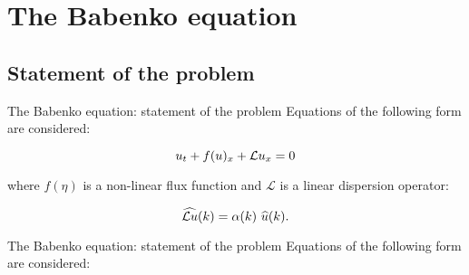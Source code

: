 
\section{The Babenko equation}
\subsection{Statement of the problem}
\begin{frame}{The Babenko equation: statement of the problem}
Equations of the following form are considered: 

\begin{equation}
u_t+ f(u)_x + \mathcal{L} u_x=0 
\end{equation}

where $f(\eta)$ is a non-linear flux function and $\mathcal{L}$ is a linear dispersion operator:

$$\widehat{\mathcal{L} u}(k)=\alpha(k)~\widehat{u}(k). $$

\end{frame}
\begin{frame}{The Babenko equation: statement of the problem}
Equations of the following form are considered: 

\end{frame}
